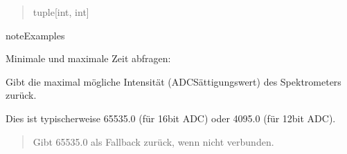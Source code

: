 \documentclass[letterpaper,10pt,english]{sphinxmanual}
\begin{document}
\begin{fulllineitems}
\begin{fulllineitems}
\begin{quote}
\begin{description}
\begin{description}
\end{description}


\sphinxAtStartPar
tuple{[}int, int{]}

\end{description}\end{quote}

\begin{sphinxadmonition}{note}{Examples}

\sphinxAtStartPar
Minimale und maximale Zeit abfragen:

\begin{sphinxVerbatim}[commandchars=\\\{\}]
   
   
\end{sphinxVerbatim}
\end{sphinxadmonition}

\end{fulllineitems}


\begin{fulllineitems}
\label{\detokenize{modulab/spectrometer_manager:modules.spectrometer.SpectrometerManager.SpectrometerManager.get_max_intensity}}
\pysigstartsignatures
\pysiglinewithargsret
{}
{}
{}
\pysigstopsignatures
\sphinxAtStartPar
Gibt die maximal mögliche Intensität (ADC\sphinxhyphen{}Sättigungswert) des Spektrometers zurück.

\sphinxAtStartPar
Dies ist typischerweise 65535.0 (für 16\sphinxhyphen{}bit ADC) oder 4095.0 (für 12\sphinxhyphen{}bit ADC).
\begin{quote}\begin{description}
\sphinxAtStartPar
\begin{description}
\sphinxAtStartPar
Gibt 65535.0 als Fallback zurück, wenn nicht verbunden.


\end{description}
\end{description}
\end{quote}
\end{fulllineitems}
\end{fulllineitems}
\end{document}
